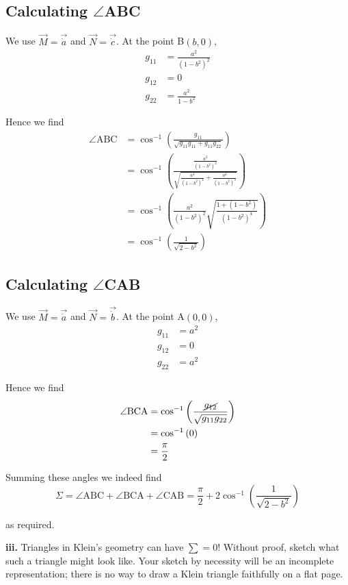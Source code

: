 \documentclass[a4paper]{article} %
\begin{document}
\subsection*{Calculating $\angle$ABC}
We use $\vec{M}=\vec{\dot{a}}$ and $\vec{N}=\vec{\dot{c}}$. At the point B$(b,0)$,
\begin{align}
g_{11}&=\frac{a^2}{(1-b^2)^2}\\
g_{12}&=0\\
g_{22}&=\frac{a^2}{1-b^2}
\end{align}

Hence we find
\begin{align}
\angle\text{ABC}&=\cos^{-1}\left(\frac{g_{11}}{\sqrt{g_{11}g_{11}+g_{11}g_{22}}}\right)\\
&=\cos^{-1}\left(\frac{\frac{a^2}{(1-b^2)^{2}}}{\sqrt{\frac{a^4}{(1-b^2)^4}+\frac{a^4}{(1-b^2)^3}}}
\right)\\
&=\cos^{-1}\left(\frac{a^2}{(1-b^2)^2}\sqrt{\frac{1+(1-b^2)}{(1-b^2)^4}}\right)\\
&=\cos^{-1}\left(\frac{1}{\sqrt{2-b^2}}\right)
\end{align}


\subsection*{Calculating $\angle$CAB}
We use $\vec{M}=\vec{\dot{a}}$ and $\vec{N}=\vec{\dot{b}}$. At the point A$(0,0)$,
\begin{align}
g_{11}&=a^2\\
g_{12}&=0\\
g_{22}&=a^2
\end{align}

Hence we find
\begin{align}
\angle\text{BCA}&=\cos^{-1}\left(\frac{\cancel{g_{12}}}{\sqrt{g_{11}g_{22}}}\right)\\
&=\cos^{-1}\left(0\right)\\
&=\frac{\pi}{2}
\end{align}

Summing these angles we indeed find
\begin{equation}
\Sigma = \angle\text{ABC}+\angle\text{BCA}+\angle\text{CAB}=\frac{\pi}{2}+2\cos^{-1}\left(\frac{1}{\sqrt{2-b^2}}\right)
\end{equation}

as required.

\pagebreak  %

\begin{framed}
\textbf{iii.} Triangles in Klein's geometry can have $\sum=0$! Without proof, sketch what such a triangle might look like. Your sketch by necessity will be an incomplete representation; there is no way to draw a Klein triangle faithfully on a flat page.
\end{framed}
\end{document}
